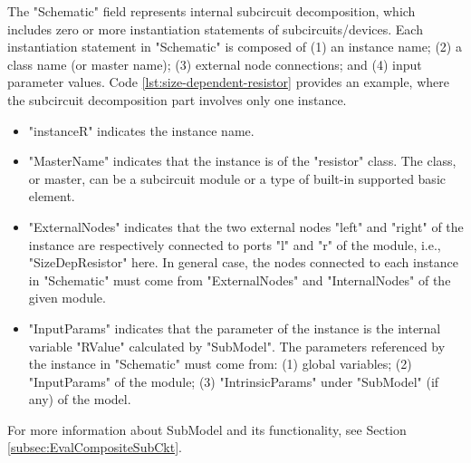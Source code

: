 The "Schematic" field represents internal subcircuit decomposition, which includes zero or more instantiation statements of subcircuits/devices. Each instantiation statement in "Schematic" is composed of (1) an instance name; (2) a class name (or master name); (3) external node connections; and (4) input parameter values. Code \ref{lst:size-dependent-resistor} provides an example, where the subcircuit decomposition part involves only one instance.
\begin{itemize}[partopsep=0pt,topsep=0pt,itemsep=0pt,parsep=0pt]
\item "instanceR" indicates the instance name.
\item "MasterName" indicates that the instance is of the "resistor" class. The class, or master, can be a subcircuit module or a type of built-in supported basic element.
\item "ExternalNodes" indicates that the two external nodes "left" and "right" of the instance are respectively connected to ports "l" and "r" of the module, i.e., "SizeDepResistor" here. In general case, the nodes connected to each instance in "Schematic" must come from "ExternalNodes" and "InternalNodes" of the given module.
\item "InputParams" indicates that the parameter of the instance is the internal variable "RValue" calculated by "SubModel". The parameters referenced by the instance in "Schematic" must come from:
(1) global variables; (2) "InputParams" of the module; (3) "IntrinsicParams" under "SubModel" (if any) of the model.
\end{itemize}
For more information about SubModel and its functionality, see Section \ref{subsec:EvalCompositeSubCkt}.


